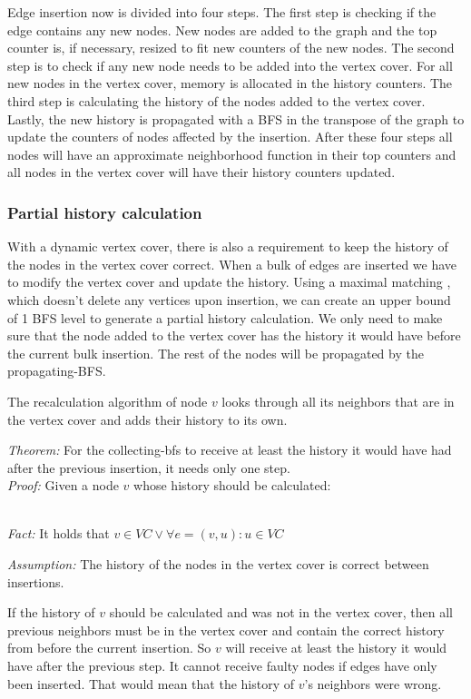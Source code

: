 Edge insertion now is divided into four steps. The first step is checking if the edge contains any new nodes. New nodes are added to the graph and the top counter is, if necessary, resized to fit new counters of the new nodes. The second step is to check if any new node needs to be added into the vertex cover. For all new nodes in the vertex cover, memory is allocated in the history counters. The third step is calculating the history of the nodes added to the vertex cover. Lastly, the new history is propagated with a BFS in the transpose of the graph to update the counters of nodes affected by the insertion. After these four steps all nodes will have an approximate neighborhood function in their top counters and all nodes in the vertex cover will have their history counters updated. 

\subsubsection{Partial history calculation}

With a dynamic vertex cover, there is also a requirement to keep the history of the nodes in the vertex cover correct. When a bulk of edges are inserted we have to modify the vertex cover and update the history. Using a maximal matching \cite{2appdynvc}, which doesn't delete any vertices upon insertion, we can create an upper bound of 1 BFS level to generate a partial history calculation. We only need to make sure that the node added to the vertex cover has the history it would have before the current bulk insertion. The rest of the nodes will be propagated by the propagating-BFS.

The recalculation algorithm of node $v$ looks through all its neighbors that are in the vertex cover and adds their history to its own. 

\noindent\textit{Theorem:} For the collecting-bfs to receive at least the history it would have had after the previous insertion, it needs only one step. \\

\noindent\textit{Proof:} Given a node $v$ whose history should be calculated:

\begin{addmargin}[2em]{0em}\\
\noindent\textit{Fact:} It holds that $v \in VC \vee \forall e = (v,u) : u \in VC$

\noindent\textit{Assumption:} The history of the nodes in the vertex cover is correct between insertions.

If the history of $v$ should be calculated and was not in the vertex cover, then all previous neighbors must be in the vertex cover and contain the correct history from before the current insertion. So $v$ will receive at least the history it would have after the previous step. It cannot receive faulty nodes if edges have only been inserted. That would mean that the history of $v$'s neighbors were wrong.
\end{addmargin} 


